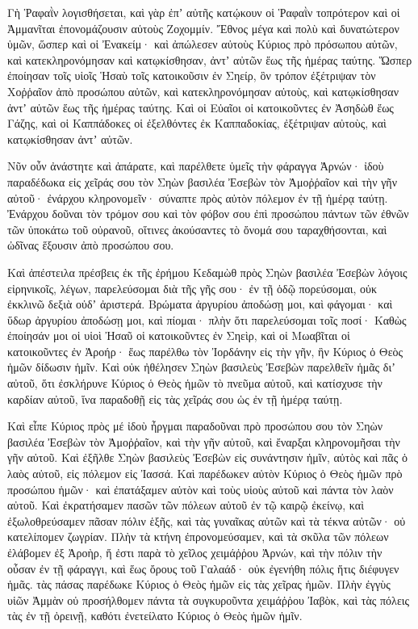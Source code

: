 {Γὴ Ῥαφαῒν λογισθήσεται, καὶ γὰρ ἐπʼ αὐτῆς κατῴκουν οἱ Ῥαφαῒν τοπρότερον καὶ οἱ Ἀμμανῖται ἐπονομάζουσιν αὐτοὺς Ζοχομμίν.
Ἔθνος μέγα καὶ πολὺ καὶ δυνατώτερον ὑμῶν, ὥσπερ καὶ οἱ Ἐνακείμ· καὶ ἀπώλεσεν αὐτοὺς Κύριος πρὸ πρόσωπου αὐτῶν, καὶ κατεκληρονόμησαν καὶ κατῳκίσθησαν, ἀντʼ αὐτῶν ἕως τῆς ἡμέρας ταύτης.
Ὥσπερ ἐποίησαν τοῖς υἱοῖς Ἡσαὺ τοῖς κατοικοῦσιν ἐν Σηείρ, ὃν τρόπον ἐξέτριψαν τὸν Χοῤῥαῖον ἀπὸ προσώπου αὐτῶν, καὶ κατεκληρονόμησαν αὐτοὺς, καὶ κατῳκίσθησαν ἀντʼ αὐτῶν ἕως τῆς ἡμέρας ταύτης.
Καὶ οἱ Εὐαῖοι οἱ κατοικοῦντες ἐν Ἀσηδὼθ ἕως Γάζης, καὶ οἱ Καππάδοκες οἱ ἐξελθόντες ἐκ Καππαδοκίας, ἐξέτριψαν αὐτοὺς, καὶ κατῳκίσθησαν ἀντʼ αὐτῶν.
\par }{\PP {}Νῦν οὖν ἀνάστητε καὶ ἀπάρατε, καὶ παρέλθετε ὑμεῖς τὴν φάραγγα Ἀρνών· ἰδοὺ παραδέδωκα εἰς χεῖράς σου τὸν Σηὼν βασιλέα Ἐσεβὼν τὸν Ἀμοῤῥαῖον καὶ τὴν γῆν αὐτοῦ· ἐνάρχου κληρονομεῖν· σύναπτε πρὸς αὐτὸν πόλεμον ἐν τῇ ἡμέρᾳ ταύτῃ.
Ἐνάρχου δοῦναι τὸν τρόμον σου καὶ τὸν φόβον σου ἐπὶ προσώπου πάντων τῶν ἐθνῶν τῶν ὑποκάτω τοῦ οὐρανοῦ, οἵτινες ἀκούσαντες τὸ ὄνομά σου ταραχθήσονται, καὶ ὠδῖνας ἕξουσιν ἀπὸ προσώπου σου.
\par }{\PP {}Καὶ ἀπέστειλα πρέσβεις ἐκ τῆς ἐρήμου Κεδαμὼθ πρὸς Σηὼν βασιλέα Ἐσεβὼν λόγοις εἰρηνικοῖς, λέγων,
παρελεύσομαι διὰ τῆς γῆς σου· ἐν τῇ ὁδῷ πορεύσομαι, οὐκ ἐκκλινῶ δεξιὰ οὐδʼ ἀριστερά.
Βρώματα ἀργυρίου ἀποδώσῃ μοι, καὶ φάγομαι· καὶ ὕδωρ ἀργυρίου ἀποδώσῃ μοι, καὶ πίομαι· πλὴν ὅτι παρελεύσομαι τοῖς ποσί·
Καθὼς ἐποίησάν μοι οἱ υἱοὶ Ἠσαῦ οἱ κατοικοῦντες ἐν Σηεὶρ, καὶ οἱ Μωαβῖται οἱ κατοικοῦντες ἐν Ἀροήρ· ἕως παρέλθω τὸν Ἰορδάνην εἰς τὴν γῆν, ἣν Κύριος ὁ Θεὸς ἡμῶν δίδωσιν ἡμῖν.
Καὶ οὐκ ἠθέλησεν Σηὼν βασιλεὺς Ἐσεβὼν παρελθεῖν ἡμᾶς διʼ αὐτοῦ, ὅτι ἐσκλήρυνε Κύριος ὁ Θεὸς ἡμῶν τὸ πνεῦμα αὐτοῦ, καὶ κατίσχυσε τὴν καρδίαν αὐτοῦ, ἵνα παραδοθῇ εἰς τὰς χεῖράς σου ὡς ἐν τῇ ἡμέρᾳ ταύτῃ.
\par }{\PP {}Καὶ εἶπε Κύριος πρὸς μέ ἰδοὺ ἦργμαι παραδοῦναι πρὸ προσώπου σου τὸν Σηὼν βασιλέα Ἐσεβὼν τὸν Ἀμοῤῥαῖον, καὶ τὴν γῆν αὐτοῦ, καὶ ἔναρξαι κληρονομῆσαι τὴν γῆν αὐτοῦ.
Καὶ ἐξῆλθε Σηὼν βασιλεὺς Ἐσεβὼν εἰς συνάντησιν ἡμῖν, αὐτὸς καὶ πᾶς ὁ λαὸς αὐτοῦ, εἰς πόλεμον εἰς Ἰασσά.
Καὶ παρέδωκεν αὐτὸν Κύριος ὁ Θεὸς ἡμῶν πρὸ προσώπου ἡμῶν· καὶ ἐπατάξαμεν αὐτὸν καὶ τοὺς υἱοὺς αὐτοῦ καὶ πάντα τὸν λαὸν αὐτοῦ.
Καὶ ἐκρατήσαμεν πασῶν τῶν πόλεων αὐτοῦ ἐν τῷ καιρῷ ἐκείνῳ, καὶ ἐξωλοθρεύσαμεν πᾶσαν πόλιν ἑξῆς, καὶ τὰς γυναῖκας αὐτῶν καὶ τὰ τέκνα αὐτῶν· οὐ κατελίπομεν ζωγρίαν.
Πλὴν τὰ κτήνη ἐπρονομεύσαμεν, καὶ τὰ σκῦλα τῶν πόλεων ἐλάβομεν
ἐξ Ἀροὴρ, ἥ ἐστι παρὰ τὸ χεῖλος χειμάῤῥου Ἀρνών, καὶ τὴν πόλιν τὴν οὖσαν ἐν τῇ φάραγγι, καὶ ἕως ὄρους τοῦ Γαλαάδ· οὐκ ἐγενήθη πόλις ἥτις διέφυγεν ἡμᾶς. τὰς πάσας παρέδωκε Κύριος ὁ Θεὸς ἡμῶν εἰς τὰς χεῖρας ἡμῶν.
Πλὴν ἐγγὺς υἱῶν Ἀμμὰν οὐ προσήλθομεν πάντα τὰ συγκυροῦντα χειμάῤῥου Ἰαβὸκ, καὶ τὰς πόλεις τὰς ἐν τῇ ὀρεινῇ, καθότι ἐνετείλατο Κύριος ὁ Θεὸς ἡμῶν ἡμῖν.

}
